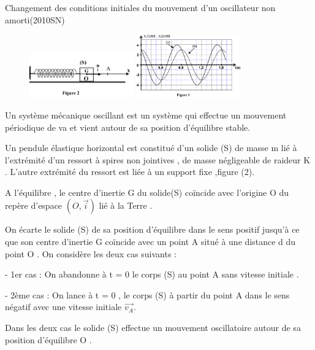 \documentclass[12pt]{article}
\begin{document}
\begin{Box2}{Changement des conditions initiales du mouvement d’un oscillateur
  non amorti(2010SN)}

	\begin{figure}
		\begin{center}
			\vspace{-0.6cm}
			\includegraphics[width=0.4\textwidth]{./img/penduleE.png}
			\includegraphics[width=0.4\textwidth]{./img/penduleE01.png}
		\end{center}
	\end{figure}


Un système mécanique oscillant est un système qui effectue un mouvement périodique de
va et vient autour de sa position d’équilibre stable.

Un pendule élastique horizontal est constitué d’un solide (S) de masse m lié à l’extrémité d’un
ressort à spires non jointives , de masse négligeable de raideur K . L’autre extrémité du ressort est
liée à un support fixe ,figure (2).

A l’équilibre , le centre d’inertie G du solide(S)
  coïncide avec l’origine O du repère d’espace $(O,\vec{i})$ lié à la Terre .

  On écarte le solide (S) de sa position d’équilibre dans
le sens positif jusqu’à ce que son centre d’inertie G
coïncide avec un point A situé à une distance d du point O .
On considère les deux cas suivants :

- 1er cas : On abandonne à t = 0 le corps (S) au point A sans vitesse initiale .

- 2ème cas : On lance à t = 0 , le corps (S) à partir du point A dans le sens négatif avec une
vitesse initiale $\vec{v_A}$.

Dans les deux cas le solide (S) effectue un mouvement oscillatoire autour de sa position
d’équilibre O .


\end{Box2}
\end{document}
